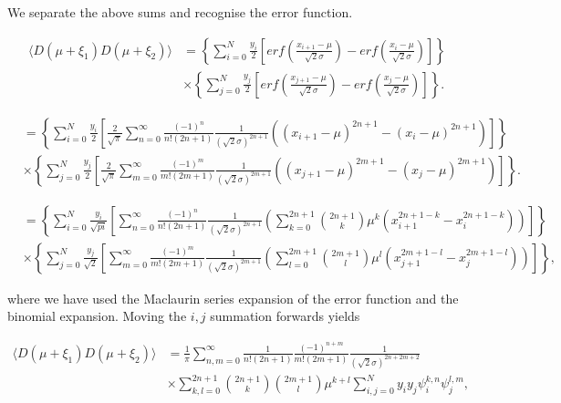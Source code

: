 \documentclass[apj]{emulateapj}
\begin{document}
We separate the above sums and recognise the error function.

\begin{equation}
\begin{aligned}
\langle D(\mu + \xi_1) D(\mu + \xi_2) \rangle &= \left\{ \sum_{i=0}^N  \frac{y_i}{2} \left[ erf \left( \frac{x_{i+1} - \mu}{\sqrt{2}\sigma} \right) - erf \left( \frac{x_{i} - \mu}{\sqrt{2}\sigma} \right) \right] \right\} \\
&\times \left\{  \sum_{j=0}^N \frac{y_j}{2} \left[ erf \left( \frac{x_{j+1} - \mu}{\sqrt{2}\sigma} \right) - erf \left( \frac{x_{j} - \mu}{\sqrt{2}\sigma} \right) \right] \right\}.
\end{aligned}
\end{equation}

\begin{equation}
\begin{aligned}
&= \left\{ \sum_{i=0}^N  \frac{y_i}{2} \left[ \frac{2}{\sqrt{\pi}} \sum_{n = 0}^\infty \frac{(-1)^n}{n! (2n+1)} \frac{1}{(\sqrt{2}\sigma)^{2n+1}} \left( (x_{i+1}-\mu)^{2n+1} - (x_{i}-\mu)^{2n+1} \right) \right] \right\} \\
&\times \left\{ \sum_{j=0}^N  \frac{y_j}{2} \left[ \frac{2}{\sqrt{\pi}} \sum_{m = 0}^\infty \frac{(-1)^m}{m! (2m+1)} \frac{1}{(\sqrt{2}\sigma)^{2m+1}} \left( (x_{j+1}-\mu)^{2m+1} - (x_{j}-\mu)^{2m+1} \right) \right] \right\}.
\end{aligned}
\end{equation}

\begin{equation}
\begin{aligned}
&= \left\{ \sum_{i=0}^N  \frac{y_i}{\sqrt{pi}} \left[ \sum_{n = 0}^\infty \frac{(-1)^n}{n! (2n+1)} \frac{1}{(\sqrt{2}\sigma)^{2n+1}} \left( \sum_{k=0}^{2n+1} {2n+1 \choose k} \mu^k ( x_{i+1}^{2n+1-k} - x_{i}^{2n+1-k} ) \right) \right] \right\} \\
&\times \left\{ \sum_{j=0}^N  \frac{y_j}{\sqrt{2}} \left[ \sum_{m = 0}^\infty \frac{(-1)^m}{m! (2m+1)} \frac{1}{(\sqrt{2}\sigma)^{2m+1}} \left( \sum_{l=0}^{2m+1} {2m+1 \choose l} \mu^l ( x_{j+1}^{2m+1-l} - x_{j}^{2m+1-l} ) \right) \right] \right\} ,
\end{aligned}
\end{equation}

where we have used the Maclaurin series expansion of the error function and the binomial expansion. Moving the $i, j$ summation forwards yields

\begin{equation} \label{eq:dcompleteklsum}
\begin{aligned}
\langle D(\mu + \xi_1) D(\mu + \xi_2) \rangle &=  \frac{1}{\pi} \sum_{n,m = 0}^\infty \frac{1}{n! (2n+1)} \frac{(-1)^{n+m}}{m! (2m+1)} \frac{1}{(\sqrt{2}\sigma)^{2n+2m+2}} \\
&\times \sum_{k, l = 0}^{2n+1} {2n+1 \choose k} {2m+1 \choose l} \mu^{k+l} \sum_{i,j=0}^N y_i y_j \psi^{k, n}_i \psi^{l, m}_j,
\end{aligned}
\end{equation}
\end{document}
